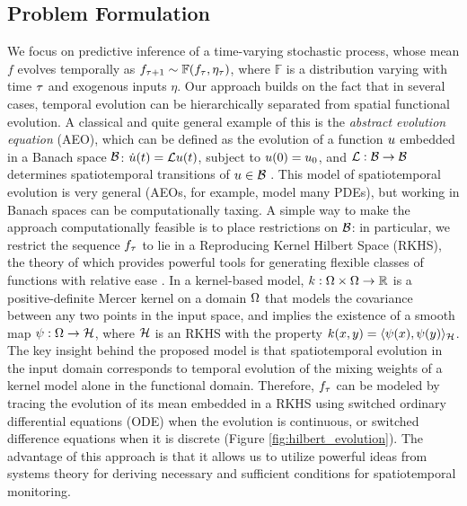 \vspace{-0.1in}
\subsection{Problem Formulation}\label{sec:formulation}
We focus on predictive inference of a time-varying stochastic process, whose mean $f$ evolves temporally as $f_{\tau+1} \sim \mathbb{F}(f_{\tau},\eta_{\tau})$, where $\mathbb{F}$ is a distribution varying with time $\tau$ and exogenous inputs $\eta$. Our approach builds on the fact that in several cases, temporal evolution can be hierarchically separated from spatial functional evolution. A classical and quite general example of this is the \emph{abstract evolution equation} (AEO), which can be defined as the evolution of a function $u$ embedded in a Banach space $\mathcal{B}$: $\dot{u}(t) = \mathcal{L}u(t)$, subject to $u(0)= u_0$, and $\mathcal{L}:\mathcal{B}\to\mathcal{B}$ determines spatiotemporal transitions of $u\in\mathcal{B}$ \cite{brezis2010functional}. This model of spatiotemporal evolution is very general (AEOs, for example, model many PDEs), but working in Banach spaces can be computationally taxing.  A simple way to make the approach computationally feasible is to place restrictions on $\mathcal{B}$: in particular, we restrict the sequence $f_{\tau}$ to lie in a Reproducing Kernel Hilbert Space (RKHS), the theory of which provides powerful tools for generating flexible classes of functions with relative ease \cite{RasmussenWilliams2005}.
In a kernel-based model, $k:\Omega\times\Omega\to\mathbb{R}$ is a positive-definite Mercer kernel on a domain $\Omega$ that models the covariance between any two points in the input space,  
and implies the existence of a smooth map $\psi:\Omega\to\mathcal{H}$, where $\mathcal{H}$ is an RKHS with the property $k(x,y) = \langle \psi(x),\psi(y) \rangle_{\mathcal{H}}$. The key insight behind the proposed model is that spatiotemporal evolution in the input domain corresponds to temporal evolution of the mixing weights of a kernel model alone in the functional domain. Therefore, $f_{\tau}$ can be modeled by tracing the evolution of its mean embedded in a RKHS using switched ordinary differential equations (ODE) when the evolution is continuous, or switched difference equations when it is discrete (Figure \ref{fig:hilbert_evolution}). 
The advantage of this approach is that it allows us to utilize powerful ideas from systems theory for deriving necessary and sufficient conditions for spatiotemporal monitoring. 
